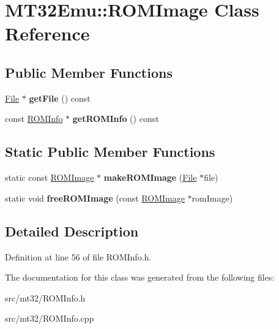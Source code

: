 \hypertarget{classMT32Emu_1_1ROMImage}{\section{M\-T32\-Emu\-:\-:R\-O\-M\-Image Class Reference}
\label{classMT32Emu_1_1ROMImage}
}
\subsection*{Public Member Functions}
\begin{DoxyCompactItemize}
\item 
\hypertarget{classMT32Emu_1_1ROMImage_aeb3c7f9c67337f6161f652debae61e61}{\hyperlink{classMT32Emu_1_1File}{File} $\ast$ {\bfseries get\-File} () const }\label{classMT32Emu_1_1ROMImage_aeb3c7f9c67337f6161f652debae61e61}

\item 
\hypertarget{classMT32Emu_1_1ROMImage_a0c315a725759a1cdc7219e6991788050}{const \hyperlink{structMT32Emu_1_1ROMInfo}{R\-O\-M\-Info} $\ast$ {\bfseries get\-R\-O\-M\-Info} () const }\label{classMT32Emu_1_1ROMImage_a0c315a725759a1cdc7219e6991788050}

\end{DoxyCompactItemize}
\subsection*{Static Public Member Functions}
\begin{DoxyCompactItemize}
\item 
\hypertarget{classMT32Emu_1_1ROMImage_a2ba11453ee0029079b427e4286bea827}{static const \hyperlink{classMT32Emu_1_1ROMImage}{R\-O\-M\-Image} $\ast$ {\bfseries make\-R\-O\-M\-Image} (\hyperlink{classMT32Emu_1_1File}{File} $\ast$file)}\label{classMT32Emu_1_1ROMImage_a2ba11453ee0029079b427e4286bea827}

\item 
\hypertarget{classMT32Emu_1_1ROMImage_a94da301e90f41a739f1390c98b92e56f}{static void {\bfseries free\-R\-O\-M\-Image} (const \hyperlink{classMT32Emu_1_1ROMImage}{R\-O\-M\-Image} $\ast$rom\-Image)}\label{classMT32Emu_1_1ROMImage_a94da301e90f41a739f1390c98b92e56f}

\end{DoxyCompactItemize}


\subsection{Detailed Description}


Definition at line 56 of file R\-O\-M\-Info.\-h.



The documentation for this class was generated from the following files\-:\begin{DoxyCompactItemize}
\item 
src/mt32/R\-O\-M\-Info.\-h\item 
src/mt32/R\-O\-M\-Info.\-cpp\end{DoxyCompactItemize}
